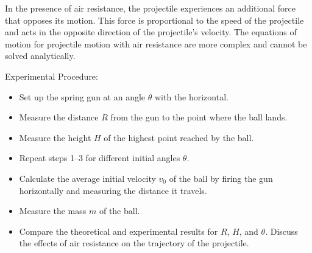In the presence of air resistance, the projectile experiences an additional force that opposes its motion. This force is proportional to the speed of the projectile and acts in the opposite direction of the projectile's velocity. The equations of motion for projectile motion with air resistance are more complex and cannot be solved analytically.

\newpage
\thispagestyle{plain}

Experimental Procedure:

\begin{itemize}
    \item Set up the spring gun at an angle $\theta$ with the horizontal.
    \item Measure the distance $R$ from the gun to the point where the ball lands. 
    \item Measure the height $H$ of the highest point reached by the ball. 
    \item Repeat steps 1--3 for different initial angles $\theta$. 
    \item Calculate the average initial velocity $v_0$ of the ball by firing the gun horizontally and measuring the distance it travels. 
    \item Measure the mass $m$ of the ball.
    \item Compare the theoretical and experimental results for $R$, $H$, and $\theta$. Discuss the effects of air resistance on the trajectory of the projectile. 
\end{itemize}
